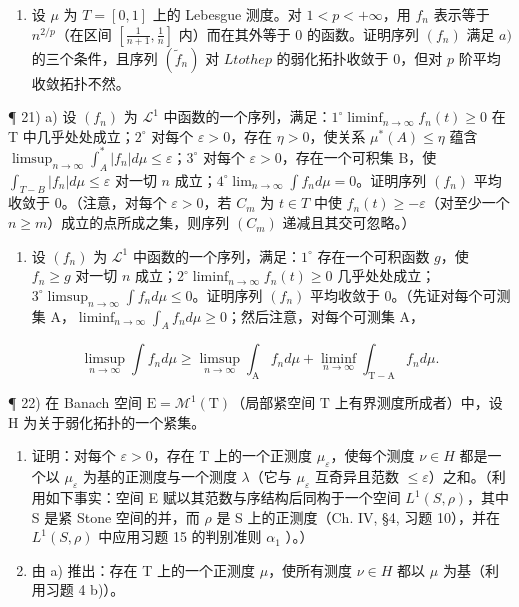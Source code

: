 \begin{enumerate}
\def\labelenumi{\alph{enumi})}
\setcounter{enumi}{1}
\tightlist
\item
  设 \(\mu\) 为 \(T = [0,1]\) 上的 Lebesgue 测度。对 \(1 < p < +\infty\)，用 \(f_n\) 表示等于 \(n^{2/p}\)（在区间 \(\left[\frac{1}{n+1}, \frac{1}{n}\right]\) 内）而在其外等于 0 的函数。证明序列 \((f_n)\) 满足 \(a)\) 的三个条件，且序列 \((\widetilde{f}_n)\) 对 \(L to the p\) 的弱化拓扑收敛于 0，但对 \(p\) 阶平均收敛拓扑不然。
\end{enumerate}

¶ 21) a) 设 \((f_n)\) 为 \(\mathcal{L}^1\) 中函数的一个序列，满足：\(1^\circ \liminf_{n \to \infty} f_n(t) \geqslant 0\) 在 T 中几乎处处成立；\(2^\circ\) 对每个 \(\varepsilon > 0\)，存在 \(\eta > 0\)，使关系 \(\mu^*(A) \leqslant \eta\) 蕴含 \(\limsup_{n \to \infty} \int_A^* |f_n| d\mu \leqslant \varepsilon\)；\(3^\circ\) 对每个 \(\varepsilon > 0\)，存在一个可积集 B，使 \(\int_{T-B} |f_n| d\mu \leqslant \varepsilon\) 对一切 \(n\) 成立；\(4^\circ \lim_{n \to \infty} \int f_n d\mu = 0\)。证明序列 \((f_n)\) 平均收敛于 0。（注意，对每个 \(\varepsilon > 0\)，若 \(C_m\) 为 \(t \in T\) 中使 \(f_n(t) \geqslant -\varepsilon\)（对至少一个 \(n \geqslant m\)）成立的点所成之集，则序列 \((C_m)\) 递减且其交可忽略。）

\begin{enumerate}
\def\labelenumi{\alph{enumi})}
\setcounter{enumi}{1}
\tightlist
\item
  设 \((f_n)\) 为 \(\mathcal{L}^1\) 中函数的一个序列，满足：\(1^\circ\) 存在一个可积函数 \(g\)，使 \(f_n \geqslant g\) 对一切 \(n\) 成立；\(2^\circ \liminf_{n \to \infty} f_n(t) \geqslant 0\) 几乎处处成立；\(3^\circ \limsup_{n \to \infty} \int f_n d\mu \leqslant 0\)。证明序列 \((f_n)\) 平均收敛于 0。（先证对每个可测集 A，\(\liminf_{n \to \infty} \int_{A} f_n d\mu \geqslant 0\)；然后注意，对每个可测集 A，
\end{enumerate}

\[
\limsup _ {n \to \infty} \int f _ {n} d \mu \geqslant \limsup _ {n \to \infty} \int_ {\mathrm{A}} f _ {n} d \mu + \liminf _ {n \to \infty} \int_ {\mathrm{T-A}} f _ {n} d \mu .
\]

¶ 22) 在 Banach 空间 \(\mathrm{E} = \mathcal{M}^1(\mathrm{T})\)（局部紧空间 \(\mathrm{T}\) 上有界测度所成者）中，设 \(\mathrm{H}\) 为关于弱化拓扑的一个紧集。

\begin{enumerate}
\def\labelenumi{\alph{enumi})}
\item
  证明：对每个 \(\varepsilon > 0\)，存在 T 上的一个正测度 \(\mu_{\varepsilon}\)，使每个测度 \(\nu \in H\) 都是一个以 \(\mu_{\varepsilon}\) 为基的正测度与一个测度 \(\lambda\)（它与 \(\mu_{\varepsilon}\) 互奇异且范数 \(\leqslant \varepsilon\)）之和。（利用如下事实：空间 E 赋以其范数与序结构后同构于一个空间 \(L^{1}(S, \rho)\)，其中 S 是紧 Stone 空间的并，而 \(\rho\) 是 S 上的正测度（Ch. IV, §4, 习题 10），并在 \(L^{1}(S, \rho)\) 中应用习题 15 的判别准则 \(\alpha_{1}\) ）。）
\item
  由 a) 推出：存在 T 上的一个正测度 \(\mu\)，使所有测度 \(\nu \in H\) 都以 \(\mu\) 为基（利用习题 4 b)）。
\end{enumerate}

